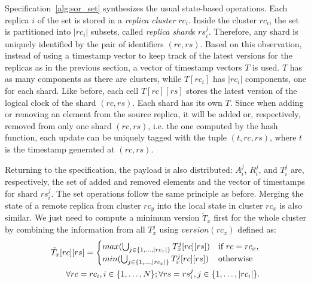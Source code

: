 \begin{algorithm}[t]
{
 }
\end{algorithm}

Specification~\ref{alg:sor_set} synthesizes the usual state-based operations.
Each replica $i$ of the set is stored in a \textit{replica cluster} $rc_{i}$.
Inside the cluster $rc_{i}$, the set is partitioned into $|rc_{i}|$ subsets,
called \textit{replica shard}s $rs_{i}^{j}$. Therefore, any shard is uniquely
identified by the pair of identifiers $(rc, rs)$. Based on this observation,
instead of using a timestamp vector to keep track of the latest versions for the
replicas as in the previous section, a vector of timestamp vectors $T$ is
used. $T$ has as many components as there are clusters, while $T[rc_{i}]$ has
$|rc_{i}|$ components, one for each shard. Like before, each cell $T[rc][rs]$
stores the latest version of the logical clock of the shard $(rc, rs)$. Each
shard has its own $T$. Since when adding or removing an element from the source
replica, it will be added or, respectively, removed from only one shard $(rc,
rs)$, i.e. the one computed by the hash function, each update can be uniquely
tagged with the tuple $(t, rc, rs)$, where $t$ is the timestamp generated at
$(rc, rs)$.

Returning to the specification, the payload is also distributed: $A_{i}^{j}$,
$R_{i}^{j}$, and $T_{i}^{j}$ are, respectively, the set of added and removed
elements and the vector of timestamps for shard $rs_{i}^{j}$. The set operations
follow the same principle as before. Merging the state of a remote replica from
cluster $rc_{y}$ into the local state in cluster $rc_{x}$ is also similar. We
just need to compute a minimum version $\tilde{T}_{x}$ first for the whole
cluster by combining the information from all $T_{x}^{j}$ using
$version(rc_{x})$ defined as:
\small
\begin{align*}
\tilde{T}_{x}[rc][rs] = \begin{cases}
                            max (\bigcup_{j \in \{1,\ldots,|rc_{x}|\}} T_{x}^{j}[rc][rs]) & \text{if } rc = rc_{x}, \\
                            min (\bigcup_{j \in \{1,\ldots,|rc_{x}|\}} T_{x}^{j}[rc][rs]) & \text{otherwise}
                        \end{cases}
\\
\hfill \forall rc = rc_{i}, i \in \{1,\ldots,N\}; \forall rs = rs_{i}^{j}, j \in \{1,\ldots,|rc_{i}|\}.
\end{align*}
\normalsize

